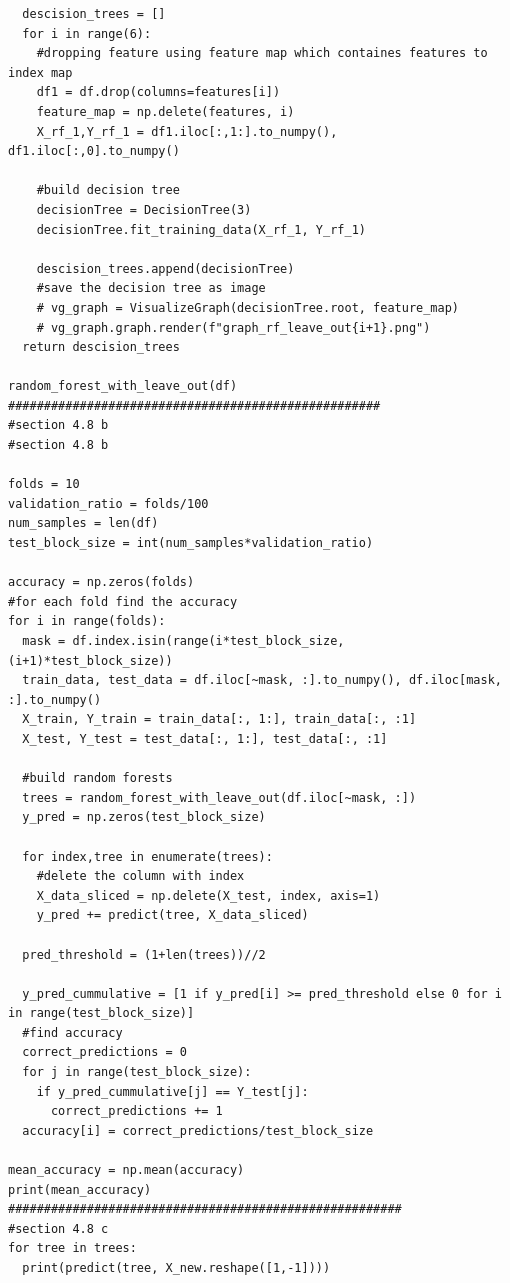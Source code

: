 \documentclass{article}
\begin{document}
\begin{lstlisting}
  descision_trees = []
  for i in range(6):
    #dropping feature using feature map which containes features to index map
    df1 = df.drop(columns=features[i])
    feature_map = np.delete(features, i)
    X_rf_1,Y_rf_1 = df1.iloc[:,1:].to_numpy(), df1.iloc[:,0].to_numpy()

    #build decision tree
    decisionTree = DecisionTree(3)
    decisionTree.fit_training_data(X_rf_1, Y_rf_1)

    descision_trees.append(decisionTree)
    #save the decision tree as image
    # vg_graph = VisualizeGraph(decisionTree.root, feature_map)
    # vg_graph.graph.render(f"graph_rf_leave_out{i+1}.png")
  return descision_trees

random_forest_with_leave_out(df)
####################################################
#section 4.8 b
#section 4.8 b 
  
folds = 10
validation_ratio = folds/100
num_samples = len(df)
test_block_size = int(num_samples*validation_ratio)

accuracy = np.zeros(folds)
#for each fold find the accuracy
for i in range(folds):
  mask = df.index.isin(range(i*test_block_size, (i+1)*test_block_size))
  train_data, test_data = df.iloc[~mask, :].to_numpy(), df.iloc[mask, :].to_numpy()
  X_train, Y_train = train_data[:, 1:], train_data[:, :1]
  X_test, Y_test = test_data[:, 1:], test_data[:, :1]

  #build random forests 
  trees = random_forest_with_leave_out(df.iloc[~mask, :])
  y_pred = np.zeros(test_block_size)

  for index,tree in enumerate(trees):
    #delete the column with index 
    X_data_sliced = np.delete(X_test, index, axis=1)
    y_pred += predict(tree, X_data_sliced)

  pred_threshold = (1+len(trees))//2

  y_pred_cummulative = [1 if y_pred[i] >= pred_threshold else 0 for i in range(test_block_size)]
  #find accuracy
  correct_predictions = 0
  for j in range(test_block_size):
    if y_pred_cummulative[j] == Y_test[j]:
      correct_predictions += 1
  accuracy[i] = correct_predictions/test_block_size

mean_accuracy = np.mean(accuracy)
print(mean_accuracy)
#######################################################
#section 4.8 c
for tree in trees:
  print(predict(tree, X_new.reshape([1,-1])))
\end{lstlisting}
\end{document}
